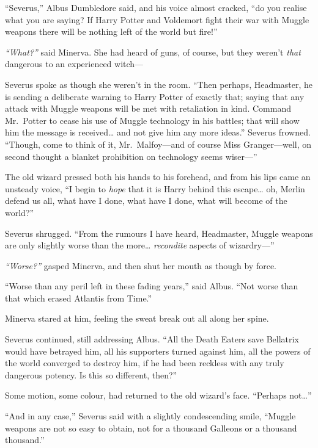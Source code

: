 ``Severus,'' Albus Dumbledore said, and his voice almost cracked, ``do
you realise what you are saying? If Harry Potter and Voldemort fight
their war with Muggle weapons there will be nothing left of the world
but fire!''

\emph{``What?''} said Minerva. She had heard of guns, of course, but
they weren't \emph{that} dangerous to an experienced witch---

Severus spoke as though she weren't in the room. ``Then perhaps,
Headmaster, he is sending a deliberate warning to Harry Potter of
exactly that; saying that any attack with Muggle weapons will be met
with retaliation in kind. Command Mr.~Potter to cease his use of Muggle
technology in his battles; that will show him the message is
received\ldots{} and not give him any more ideas.'' Severus frowned.
``Though, come to think of it, Mr.~Malfoy---and of course Miss
Granger---well, on second thought a blanket prohibition on technology
seems wiser---''

The old wizard pressed both his hands to his forehead, and from his lips
came an unsteady voice, ``I begin to \emph{hope} that it is Harry behind
this escape\ldots{} oh, Merlin defend us all, what have I done, what
have I done, what will become of the world?''

Severus shrugged. ``From the rumours I have heard, Headmaster, Muggle
weapons are only slightly worse than the more\ldots{} \emph{recondite}
aspects of wizardry---''

\emph{``Worse?''} gasped Minerva, and then shut her mouth as though by
force.

``Worse than any peril left in these fading years,'' said Albus. ``Not
worse than that which erased Atlantis from Time.''

Minerva stared at him, feeling the sweat break out all along her spine.

Severus continued, still addressing Albus. ``All the Death Eaters save
Bellatrix would have betrayed him, all his supporters turned against
him, all the powers of the world converged to destroy him, if he had
been reckless with any truly dangerous potency. Is this so different,
then?''

Some motion, some colour, had returned to the old wizard's face.
``Perhaps not\ldots{}''

``And in any case,'' Severus said with a slightly condescending smile,
``Muggle weapons are not so easy to obtain, not for a thousand Galleons
or a thousand thousand.''

